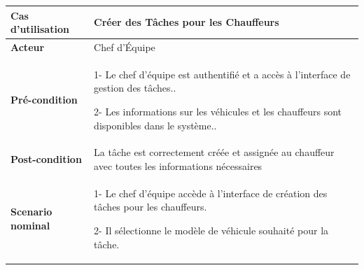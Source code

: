 \begin{table}[H]
  \centering
  \renewcommand{\arraystretch}{1} %
  \begin{tabular}{|p{4cm}|p{9cm}|}
    \hline
    \textbf{Cas d'utilisation} & Créer des Tâches pour les Chauffeurs                                                                    \\
    \hline
    \textbf{Acteur}            & Chef d'Équipe                                                                                           \\
    \hline
    \textbf{Pré-condition}     & 1- Le chef d'équipe est authentifié et a accès à l'interface de gestion des tâches..\newline

    2- Les informations sur les véhicules et les chauffeurs sont disponibles dans le système..                                           \\
    \hline
    \textbf{Post-condition}    & La tâche est correctement créée et assignée au chauffeur avec toutes les informations nécessaires       \\
    \hline
    \textbf{Scenario nominal}  & 1- Le chef d'équipe accède à l'interface de création des tâches pour les chauffeurs.\newline


    2- Il sélectionne le modèle de véhicule souhaité pour la tâche.\\

    
  \end{tabular}
\end{table}


